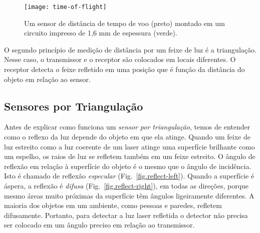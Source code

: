 \begin{figure}
\texttt{[image: time-of-flight]}
\caption{Um sensor de distância de tempo de voo (preto) montado em um circuito impresso de 1,6 mm de espessura (verde).}\label{fig.ir}
\end{figure}

O segundo princípio de medição de distância por um feixe de luz é a triangulação. Nesse caso, o transmissor e o receptor são colocados em locais diferentes. O receptor detecta o feixe refletido em uma posição que é função da distância do objeto em relação ao sensor.

\subsection{Sensores por Triangulação}\label{s.triangulating-sensors}

Antes de explicar como funciona um \emph{sensor por triangulação}, temos de entender como o reflexo da luz depende do objeto em que ela atinge. Quando um feixe de luz estreito como a luz coerente de um laser atinge uma superfície brilhante como um espelho, os raios de luz se refletem também em um feixe estreito. O ângulo de reflexão em relação à superfície do objeto é o mesmo que o ângulo de incidência. Isto é chamado de reflexão \emph{especular} (Fig.~\ref{fig.reflect-left}). Quando a superfície é áspera, a reflexão é \emph{difusa} (Fig.~\ref{fig.reflect-right}), em todas as direções, porque mesmo áreas muito próximas da superfície têm ângulos ligeiramente diferentes. A maioria dos objetos em um ambiente, como pessoas e paredes, refletem difusamente. Portanto, para detectar a luz laser refletida o detector não precisa ser colocado em um ângulo preciso em relação ao transmissor.

